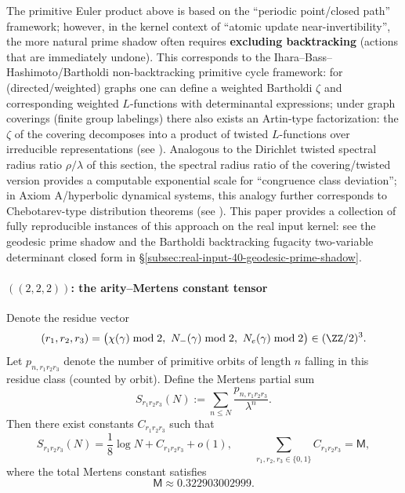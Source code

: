 \begin{remark}\label{rem:rotation-polytope-bartholdi}
The primitive Euler product above is based on the ``periodic point/closed path'' framework; however, in the kernel context of ``atomic update near-invertibility'', the more natural prime shadow often requires \textbf{excluding backtracking} (actions that are immediately undone). This corresponds to the Ihara--Bass--Hashimoto/Bartholdi non-backtracking primitive cycle framework: for (directed/weighted) graphs one can define a weighted Bartholdi $\zeta$ and corresponding weighted $L$-functions with determinantal expressions; under graph coverings (finite group labelings) there also exists an Artin-type factorization: the $\zeta$ of the covering decomposes into a product of twisted $L$-functions over irreducible representations (see \cite{ChoeKwakParkSato2007Bartholdi,Sato2008WeightedBartholdiCoverings}). Analogous to the Dirichlet twisted spectral radius ratio $\rho/\lambda$ of this section, the spectral radius ratio of the covering/twisted version provides a computable exponential scale for ``congruence class deviation''; in Axiom A/hyperbolic dynamical systems, this analogy further corresponds to Chebotarev-type distribution theorems (see \cite{PollicottSharp2007Chebotarev}).
This paper provides a collection of fully reproducible instances of this approach on the real input kernel: see the geodesic prime shadow and the Bartholdi backtracking fugacity two-variable determinant closed form in \S\ref{subsec:real-input-40-geodesic-prime-shadow}.
\end{remark}

\paragraph{\texorpdfstring{$((2,2,2))$}{(2,2,2)}: the arity--Mertens constant tensor}
Denote the residue vector
$$
(r_1,r_2,r_3)=\bigl(\chi(\gamma)\bmod 2,\ N_-(\gamma)\bmod 2,\ N_e(\gamma)\bmod 2\bigr)\in(\ZZ/2)^3.
$$
Let $p_{n,r_1r_2r_3}$ denote the number of primitive orbits of length $n$ falling in this residue class (counted by orbit). Define the Mertens partial sum
$$
S_{r_1r_2r_3}(N):=\sum_{n\le N}\frac{p_{n,r_1r_2r_3}}{\lambda^n}.
$$
Then there exist constants $C_{r_1r_2r_3}$ such that
$$
S_{r_1r_2r_3}(N)=\frac{1}{8}\log N + C_{r_1r_2r_3}+o(1),
\qquad
\sum_{r_1,r_2,r_3\in\{0,1\}}C_{r_1r_2r_3}=\mathsf{M},
$$
where the total Mertens constant satisfies
$$
\mathsf{M}\approx 0.322903002999.
$$


